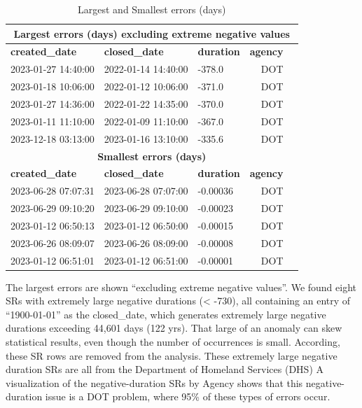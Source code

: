 \documentclass[12pt, titlepage]{article}
\begin{document}
	\begin{table}[tbp]
	    \centering
	    \caption{Largest and Smallest errors (days)}
		    \begin{tabular}{l l l r l}
		        \toprule
		        \multicolumn{5}{c}{\textbf{Largest errors (days) excluding 
		        extreme negative values}} \\
		        \midrule
		        \textbf{created\_date} & \textbf{closed\_date} & \textbf{duration} 
		        & \textbf{agency} \\
			        \midrule
			        2023-01-27 14:40:00 & 2022-01-14 14:40:00 & -378.0 & DOT \\
			        2023-01-18 10:06:00 & 2022-01-12 10:06:00 & -371.0 & DOT \\
			        2023-01-27 14:36:00 & 2022-01-22 14:35:00 & -370.0 & DOT \\
			        2023-01-11 11:10:00 & 2022-01-09 11:10:00 & -367.0 & DOT \\
			        2023-12-18 03:13:00 & 2023-01-16 13:10:00 & -335.6 & DOT \\
			        \midrule
			        \multicolumn{5}{c}{\textbf{Smallest errors (days)}} \\
			        \midrule
			        \textbf{created\_date} & \textbf{closed\_date} & \textbf{duration} 
			        & \textbf{agency} \\
			        \midrule
			        2023-06-28 07:07:31 & 2023-06-28 07:07:00 & -0.00036 & DOT \\
			        2023-06-29 09:10:20 & 2023-06-29 09:10:00 & -0.00023 & DOT \\
			        2023-01-12 06:50:13 & 2023-01-12 06:50:00 & -0.00015 & DOT \\
			        2023-06-26 08:09:07 & 2023-06-26 08:09:00 & -0.00008 & DOT \\
			        2023-01-12 06:51:01 & 2023-01-12 06:51:00 & -0.00001 & DOT \\
			        \bottomrule
		    \end{tabular}
	    \label{tab:combined_errors}
	\end{table}
	
	The largest errors are shown ``excluding extreme negative values''. We found 
	eight SRs with extremely large negative durations (\textless{} -730), all containing 
	an entry of ``1900-01-01'' as the closed\_date, which generates extremely large 
	negative durations exceeding 44,601 days (122 yrs). That large of an anomaly 
	can skew statistical results, even though the number of occurrences is 
	small. According, these  SR rows are removed from the analysis. These 
	extremely large negative duration SRs are all from the 
	Department of Homeland Services (DHS) A visualization of the 
	negative-duration SRs by Agency shows that this negative-duration 
	issue is a DOT problem, where 95\% of these types of errors occur. 
	
\end{document}
